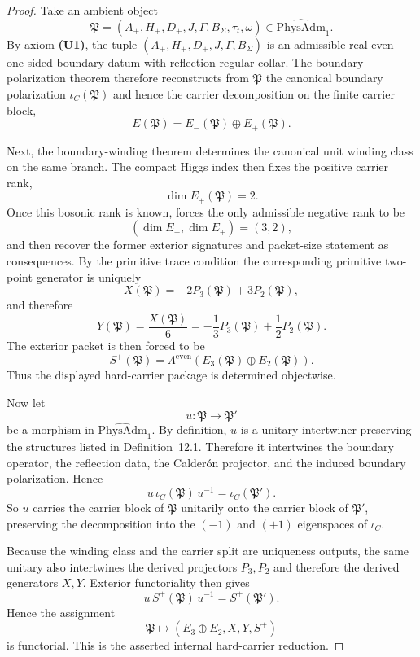 \documentclass[11pt,a4paper]{article}
\theoremstyle{definition}
\theoremstyle{remark}
\newcommand{\PhysAdmOne}{\widehat{\mathrm{PhysAdm}}_1}
\begin{document}
\begin{proof}
Take an ambient object
\[
\mathfrak P=(A_+,H_+,D_+,J,\Gamma,B_\Sigma,\tau_t,\omega)\in\PhysAdmOne.
\]
By axiom \textbf{(U1)}, the tuple $(A_+,H_+,D_+,J,\Gamma,B_\Sigma)$ is an admissible real even
one-sided boundary datum with reflection-regular collar. The boundary-polarization theorem
therefore reconstructs from $\mathfrak P$ the canonical boundary polarization $\iota_C(\mathfrak
P)$ and hence the carrier decomposition on the finite carrier block,
\[
E(\mathfrak P)=E_-(\mathfrak P)\oplus E_+(\mathfrak P).
\]

Next, the boundary-winding theorem determines the canonical unit winding class on the same branch.
The compact Higgs index then fixes the positive carrier rank,
\[
\dim E_+(\mathfrak P)=2.
\]
Once this bosonic rank is known,  forces the only admissible negative
rank to be
\[
(\dim E_-,\dim E_+)=(3,2),
\]
and  then recover the former exterior
signatures and packet-size statement as consequences. By the primitive trace condition the
corresponding primitive two-point generator is uniquely
\[
X(\mathfrak P)=-2P_3(\mathfrak P)+3P_2(\mathfrak P),
\]
and therefore
\[
Y(\mathfrak P)=\frac{X(\mathfrak P)}6=-\frac13P_3(\mathfrak P)+\frac12P_2(\mathfrak P).
\]
The exterior packet is then forced to be
\[
S^+(\mathfrak P)=\Lambda^{\mathrm{even}}(E_3(\mathfrak P)\oplus E_2(\mathfrak P)).
\]
Thus the displayed hard-carrier package is determined objectwise.

Now let
\[
u:\mathfrak P\to \mathfrak P'
\]
be a morphism in $\PhysAdmOne$. By definition, $u$ is a unitary intertwiner preserving the
structures listed in Definition~12.1. Therefore it intertwines the boundary operator, the
reflection data, the Calder\'on projector, and the induced boundary polarization. Hence
\[
u\,\iota_C(\mathfrak P)\,u^{-1}=\iota_C(\mathfrak P').
\]
So $u$ carries the carrier block of $\mathfrak P$ unitarily onto the carrier block of $\mathfrak
P'$, preserving the decomposition into the $(-1)$ and $(+1)$ eigenspaces of $\iota_C$.

Because the winding class and the carrier split are uniqueness outputs, the same unitary also
intertwines the derived projectors $P_3,P_2$ and therefore the derived generators $X,Y$. Exterior
functoriality then gives
\[
u\,S^+(\mathfrak P)\,u^{-1}=S^+(\mathfrak P').
\]
Hence the assignment
\[
\mathfrak P\longmapsto (E_3\oplus E_2,X,Y,S^+)
\]
is functorial. This is the asserted internal hard-carrier reduction.
\end{proof}
\end{document}
